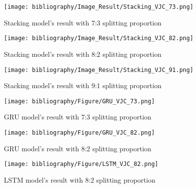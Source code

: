 \documentclass{ieeeojies}
\begin{document}
\vspace{-2em}
\begin{figure}[H]
  \centering
  \begin{minipage}{0.8\linewidth}
    \centering
    \texttt{[image: bibliography/Image\_Result/Stacking\_VJC\_73.png]}
    \caption{Stacking model's result with 7:3 splitting proportion}
    \label{fig8}
  \end{minipage}
\end{figure}

\begin{figure}[H]
  \centering
  \begin{minipage}{0.8\linewidth}
    \centering
    \texttt{[image: bibliography/Image\_Result/Stacking\_VJC\_82.png]}
    \caption{Stacking model's result with 8:2 splitting proportion}
    \label{fig9}
  \end{minipage}
\end{figure}

\begin{figure}[H]
  \centering
  \begin{minipage}{0.8\linewidth}
    \centering
    \texttt{[image: bibliography/Image\_Result/Stacking\_VJC\_91.png]}
    \caption{Stacking model's result with 9:1 splitting proportion}
    \label{fig8}
  \end{minipage}
\end{figure}

\begin{figure}[H]
  \centering
  \begin{minipage}{0.8\linewidth}
    \centering
    \texttt{[image: bibliography/Figure/GRU\_VJC\_73.png]}
    \caption{GRU model's result with 7:3 splitting proportion}
    \label{fig9}
  \end{minipage}
\end{figure}

\begin{figure}[H]
  \centering
  \begin{minipage}{0.8\linewidth}
    \centering
    \texttt{[image: bibliography/Figure/GRU\_VJC\_82.png]}
    \caption{GRU model's result with 8:2 splitting proportion}
    \label{fig8}
  \end{minipage}
\end{figure}

\begin{figure}[H]
  \centering
  \begin{minipage}{0.8\linewidth}
    \centering
    \texttt{[image: bibliography/Figure/LSTM\_VJC\_82.png]}
    \caption{LSTM model's result with 8:2 splitting proportion}
    \label{fig8}
  \end{minipage}
\end{figure}
\end{document}

